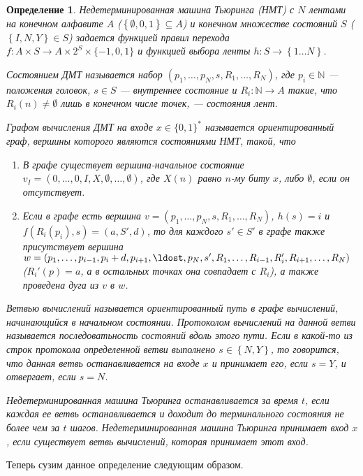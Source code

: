 \documentclass[14pt, a4paper]{extreport}
\newtheorem{definition}{\indent Определение}
\newcommand{\word}{\{0, 1\}^*}
\newcommand{\set}[1]{\left\{#1\right\}}
\begin{document}
\begin{definition}Недетерминированная машина Тьюринга (НМТ) с $N$ лентами на конечном алфавите $A$ ($\set{\emptyset, 0, 1} \subseteq A$) и конечном множестве состояний $S$ ($\set{I, N, Y} \in S$) задается функцией правил перехода $f: A \times S \longrightarrow A \times 2^S \times \{-1, 0, 1\}$ и функцией выбора ленты $h: S \longrightarrow \set{1\ldots N}$.

Состоянием ДМТ называется набор $\left(p_1, \ldots, p_N, s, R_1, \ldots, R_N\right)$, где $p_i \in \mathbb{N}$ --- положения головок, $s \in S$ --- внутреннее состояние и $R_i: \mathbb{N} \longrightarrow A$ такие, что $R_i(n) \neq \emptyset$ лишь в конечном числе точек, --- состояния лент.

Графом вычисления ДМТ на входе $x \in \word$ называется ориентированный граф, вершины которого являются состояниями НМТ, такой, что
\begin{enumerate}
    \item В графе существует вершина-начальное состояние $v_I = \left(0, \ldots, 0, I, X, \emptyset, \ldots, \emptyset\right)$, где $X(n)$ равно $n$-му биту $x$, либо $\emptyset$, если он отсутствует.
    \item Если в графе есть вершина $v = \left(p_1, \ldots, p_N, s, R_1, \ldots, R_N\right)$, $h(s) = i$ и $f(R_i(p_i), s) = (a, S', d)$, то для каждого $s' \in S'$ в графе также присутствует вершина $w = \left(p_1, \ldots, p_{i-1}, p_i + d, p_{i+1}, \ldost, p_N, s', R_1, \ldots, R_{i-1}, R'_i, R_{i+1}, \ldots, R_N\right)$ ($R_i'(p) = a$, а в остальных точках она совпадает с $R_i$), а также проведена дуга из $v$ в $w$.
\end{enumerate}

Ветвью вычислений называется ориентированный путь в графе вычислений, начинающийся в начальном состоянии. Протоколом вычислений на данной ветви называется последоватьность состояний вдоль этого пути.
Если в какой-то из строк протокола определенной ветви выполнено $s \in \set{N, Y}$, то говорится, что данная ветвь останавливается на входе $x$ и принимает его, если $s = Y$, и отвергает, если $s = N$. 

Недетерминированная машина Тьюринга останавливается за время $t$, если каждая ее ветвь останавливается и доходит до терминального состояния не более чем за $t$ шагов. 
Недетерминированная машина Тьюринга принимает вход $x$, если существует ветвь вычислений, которая принимает этот вход.
\end{definition}
Теперь сузим данное определение следующим образом.
\end{document}
